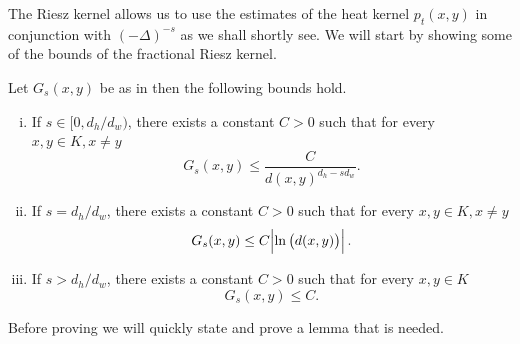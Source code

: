 \medskip
The Riesz kernel allows us to use the estimates of the heat kernel $p_t(x,y)$ in conjunction with $(-\Delta)^{-s}$ as we shall shortly see. We will start by showing some of the bounds of the fractional Riesz kernel. 
\clearpage
\begin{prop}\label{boundsOfRieszKernel}
	Let $G_s(x,y)$ be as in  then the following bounds hold.
	\begin{enumerate}[(i)]
		\item If $s \in [0, d_h/d_w)$, there exists a constant $C > 0$ such that for every $x,y \in K, x \neq y$
		\begin{equation}
			G_s(x,y) \leq \frac{C}{d(x,y)^{d_h-sd_w}}.
		\end{equation}
		
		\item If $s = d_h/d_w$, there exists a constant $C > 0$ such that for every $x,y \in K, x \neq y$
			\begin{equation}
				G_s(x,y) \leq C \abs{\ln \left(d(x,y) \right)}.
			\end{equation}
			
		\item If $s > d_h/d_w$, there exists a constant $C > 0$ such that for every $x,y \in K$
		\begin{equation}
			G_s(x,y) \leq C.
		\end{equation}
	\end{enumerate}
\end{prop}
Before proving  we will quickly state and prove a lemma that is needed.

